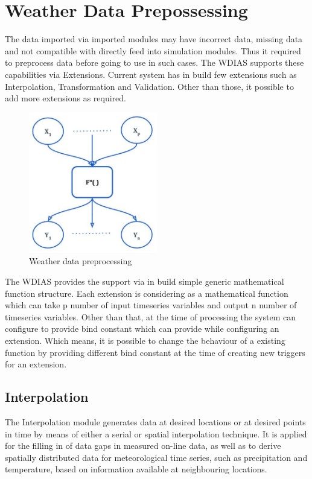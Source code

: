 \section{Weather Data Prepossessing}

The data imported via imported modules may have incorrect data, missing data and not compatible with directly feed into simulation modules. 
Thus it required to preprocess data before going to use in such cases. The WDIAS supports these capabilities via Extensions. Current system has
in build few extensions such as Interpolation, Transformation and Validation. Other than those, it possible to add more extensions as required.
\begin{figure}[htp]
    \centering
    \includegraphics[width=0.5\textwidth]{method/data_preprocess/weather_data_preprocessing.jpg}
    \caption{Weather data preprocessing}
    \label{fi:weather_data_preprocessing}
\end{figure}
The WDIAS provides the support via in build simple generic mathematical function structure. Each extension is considering as a mathematical function which can take p 
number of input timeseries variables and output n number of timeseries variables. Other than that, at the time of processing the system can configure to provide
bind constant which can provide while configuring an extension. Which means, it is possible to change the behaviour of a existing function by providing different bind
constant at the time of creating new triggers for an extension.

\subsection{Interpolation}
The Interpolation module generates data at desired locations or at desired points in time by means of either a serial or spatial interpolation technique. It is applied for the filling in of data gaps in measured on-line data, as well as to derive spatially distributed data for meteorological time series, such as precipitation and temperature, based on information available at neighbouring locations.

